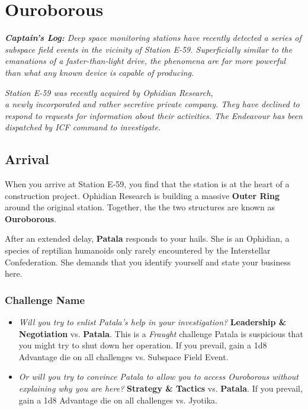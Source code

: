 \documentclass[11pt, a5paper, parskip=half-, DIV=12]{scrartcl}
\begin{document}
\section*{Ouroborous}
\textit{\textbf{Captain's Log:} Deep space monitoring stations have recently detected a series of subspace field events in the vicinity of Station E-59. Superficially similar to the emanations of a faster-than-light drive, the phenomena are far more powerful than what any known device is capable of producing.}

\textit{Station E-59 was recently acquired by Ophidian Research, \\a newly incorporated \textemdash{} and rather secretive \textemdash{} private company. They have declined to respond to requests for information about their activities. The Endeavour has been dispatched by ICF command to investigate.}

\subsection*{Arrival}
When you arrive at Station E-59, you find that the station is at the heart of a construction project.  Ophidian Research is building a massive \textbf{Outer Ring} around the original station. Together, the the two structures are known as \textbf{Ouroborous}.

After an extended delay, \textbf{Patala} responds to your hails. She is an Ophidian, a species of reptilian humanoids only rarely encountered by the Interstellar Confederation. She demands that you identify yourself and state your business here.

\subsubsection*{Challenge Name}
\begin{itemize}
	\item \textit{Will you try to enlist Patala's help in your investigation?} \textbf{Leadership \& Negotiation} vs. \textbf{Patala}. This is a \textit{Fraught} challenge \textemdash{} Patala is suspicious that you might try to shut down her operation. If you prevail, gain a 1d8 Advantage die on all challenges vs. Subspace Field Event.
	\item \textit{Or will you try to convince Patala to allow you to access Ouroborous without explaining why you are here?} \textbf{Strategy \& Tactics} vs. \textbf{Patala}. If you prevail, gain a 1d8 Advantage die on all challenges vs. Jyotika.  
\end{itemize}
\end{document}
